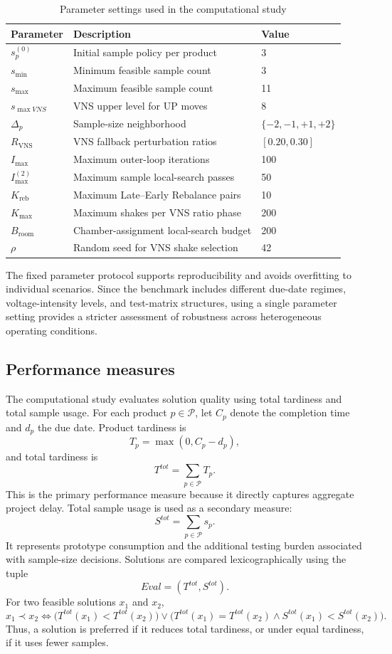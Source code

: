 \documentclass[11pt]{article}
\begin{document}
\begin{table}[H]
\centering
\caption{Parameter settings used in the computational study}
\label{tab:param_settings_final}

\begin{tabular}{lll}
\hline
\textbf{Parameter} & \textbf{Description} & \textbf{Value} \\
\hline
\(s_p^{(0)}\) & Initial sample policy per product & 3 \\
\(s_{\min}\) & Minimum feasible sample count & 3 \\
\(s_{\max}\) & Maximum feasible sample count & 11 \\
\(s_{\max VNS}\) & VNS upper level for UP moves & 8 \\
\(\Delta_p\) & Sample-size neighborhood & \(\{-2,-1,+1,+2\}\) \\
\(R_{\mathrm{VNS}}\) & VNS fallback perturbation ratios & \([0.20,0.30]\) \\
\(I_{\max}\) & Maximum outer-loop iterations & 100 \\
\(I_{\max}^{(2)}\) & Maximum sample local-search passes & 50 \\
\(K_{\mathrm{reb}}\) & Maximum Late--Early Rebalance pairs & 10 \\
\(K_{\max}\) & Maximum shakes per VNS ratio phase & 200 \\
\(B_{\mathrm{room}}\) & Chamber-assignment local-search budget & 200 \\
\(\rho\) & Random seed for VNS shake selection & 42 \\
\hline
\end{tabular}
\end{table}

The fixed parameter protocol supports reproducibility and avoids overfitting to individual scenarios. Since the benchmark includes different due-date regimes, voltage-intensity levels, and test-matrix structures, using a single parameter setting provides a stricter assessment of robustness across heterogeneous operating conditions.
\subsection{Performance measures}
\label{subsec:metrics}

The computational study evaluates solution quality using total tardiness and total sample usage. For each product \(p\in\mathcal{P}\), let \(C_p\) denote the completion time and \(d_p\) the due date. Product tardiness is
\[
T_p=\max(0,C_p-d_p),
\]
and total tardiness is
\[
T^{tot}=\sum_{p\in\mathcal{P}}T_p.
\]
This is the primary performance measure because it directly captures aggregate project delay. Total sample usage is used as a secondary measure:
\[
S^{tot}=\sum_{p\in\mathcal{P}}s_p.
\]
It represents prototype consumption and the additional testing burden associated with sample-size decisions. Solutions are compared lexicographically using the tuple
\[
Eval=(T^{tot},S^{tot}).
\]
For two feasible solutions \(x_1\) and \(x_2\),
\[
x_1 \prec x_2
\iff
\big(T^{tot}(x_1)<T^{tot}(x_2)\big)
\lor
\big(T^{tot}(x_1)=T^{tot}(x_2)\land S^{tot}(x_1)<S^{tot}(x_2)\big).
\]
Thus, a solution is preferred if it reduces total tardiness, or under equal tardiness, if it uses fewer samples.
\end{document}
